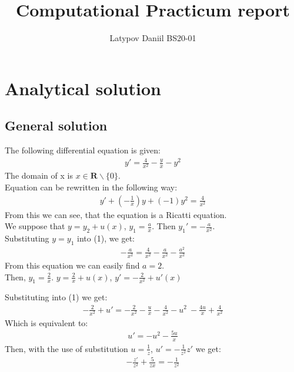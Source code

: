 \documentclass[12pt]{article}
\title{Computational Practicum report}
\author{Latypov Daniil BS20-01}
\date{}
\begin{document}
\maketitle
\section*{Analytical solution}
\subsection*{General solution}
The following differential equation is given:
\begin{gather}
y'=\frac{4}{x^2} - \frac{y}{x} - y^2
\end{gather}
The domain of x is $x \in \mathbf{R} \backslash \{0\}$. \\
Equation can be rewritten in the following way:
\begin{gather*}
    y'+(- \frac{1}{x})y + ( -1 ) y^2 = \frac{4}{x^2}
\end{gather*}
From this we can see, that the equation is a Ricatti equation. \\
We suppose that $y = y_2 + u(x)$, $y_1 = \frac{a}{x}$. Then $y_1' = - \frac{a}{x^2}$. \\ 

Substituting $y=y_1$ into (1), we get:
\begin{gather*}
- \frac{a}{x^2} = \frac{4}{x^2} - \frac{a}{x^2} - \frac{a^2}{x^2}
\end{gather*}
From this equation we can easily find $a=2$. \\
Then, $y_1 = \frac{2}{x}$. $y = \frac{2}{x} + u(x)$,
$y' = - \frac{2}{x^2} + u'(x)$

Substituting into (1) we get:
\begin{gather*}
- \frac{2}{x^2} + u' = - \frac{2}{x^2} - \frac{u}{x} - \frac{4}{x^2} - u^2\
- \frac{4u}{x} + \frac{4}{x^2}
\end{gather*}
Which is equivalent to:
\begin{gather}
u'= -u^2 - \frac{5u}{x}
\end{gather}
Then, with the use of substitution $ u = \frac{1}{z}$, 
$u'= - \frac{1}{z^2}z'$ we get:
\begin{gather*}
- \frac{z'}{z^2} + \frac{5}{zx} = - \frac{1}{z^2}
\end{gather*}
\end{document}
